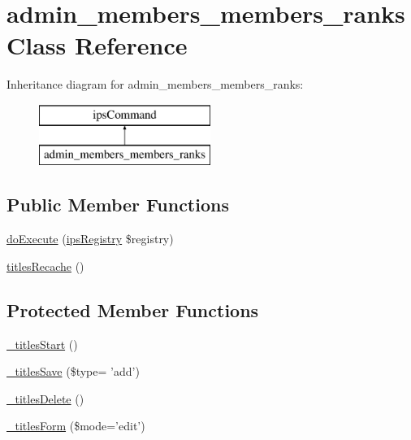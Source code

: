 \hypertarget{classadmin__members__members__ranks}{\section{admin\-\_\-members\-\_\-members\-\_\-ranks Class Reference}
\label{classadmin__members__members__ranks}
}
Inheritance diagram for admin\-\_\-members\-\_\-members\-\_\-ranks\-:\begin{figure}[H]
\begin{center}
\leavevmode
\includegraphics[height=2.000000cm]{classadmin__members__members__ranks}
\end{center}
\end{figure}
\subsection*{Public Member Functions}
\begin{DoxyCompactItemize}
\item 
\hyperlink{classadmin__members__members__ranks_afbc4e912a0604b94d47d66744c64d8ba}{do\-Execute} (\hyperlink{classips_registry}{ips\-Registry} \$registry)
\item 
\hyperlink{classadmin__members__members__ranks_afe31a053aec53afb17d7d7f6e48fae08}{titles\-Recache} ()
\end{DoxyCompactItemize}
\subsection*{Protected Member Functions}
\begin{DoxyCompactItemize}
\item 
\hyperlink{classadmin__members__members__ranks_a6d4b76693c2a1d468a29aae850137ab6}{\-\_\-titles\-Start} ()
\item 
\hyperlink{classadmin__members__members__ranks_a1f8afe064842d40fd3b7f5842e2f51b3}{\-\_\-titles\-Save} (\$type= 'add')
\item 
\hyperlink{classadmin__members__members__ranks_aec430169f15cd94bb7e7d6a6479827b9}{\-\_\-titles\-Delete} ()
\item 
\hyperlink{classadmin__members__members__ranks_a910c3e7ebd180f7dce8481cbbb66e190}{\-\_\-titles\-Form} (\$mode='edit')
\end{DoxyCompactItemize}
